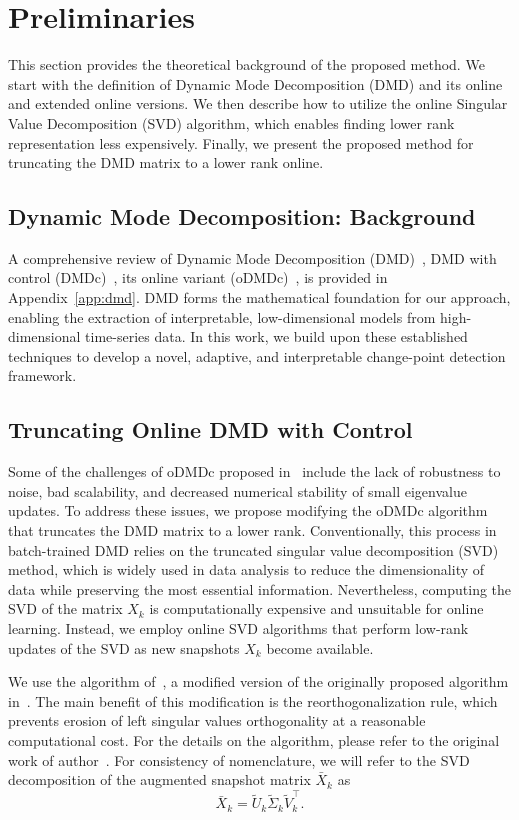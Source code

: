 \section{Preliminaries}\label{sec:preliminaries}

This section provides the theoretical background of the proposed method. We start with the definition of Dynamic Mode Decomposition (DMD) and its online and extended online versions. We then describe how to utilize the online Singular Value Decomposition (SVD) algorithm, which enables finding lower rank representation less expensively. Finally, we present the proposed method for truncating the DMD matrix to a lower rank online.

\subsection{Dynamic Mode Decomposition: Background}
A comprehensive review of Dynamic Mode Decomposition (DMD)~\cite{Schmid2010}, DMD with control (DMDc)~\cite{Proctor2016}, its online variant (oDMDc)~\cite{Zhang2019}, is provided in Appendix~\ref{app:dmd}. DMD forms the mathematical foundation for our approach, enabling the extraction of interpretable, low-dimensional models from high-dimensional time-series data. In this work, we build upon these established techniques to develop a novel, adaptive, and interpretable change-point detection framework.

\subsection{Truncating Online DMD with Control}\label{sec:truncating-online-dmd}
Some of the challenges of oDMDc proposed in~\cite{Zhang2019} include the lack of robustness to noise, bad scalability, and decreased numerical stability of small eigenvalue updates. To address these issues, we propose modifying the oDMDc algorithm that truncates the DMD matrix to a lower rank. Conventionally, this process in batch-trained DMD relies on the truncated singular value decomposition (SVD) method, which is widely used in data analysis to reduce the dimensionality of data while preserving the most essential information. Nevertheless, computing the SVD of the matrix \(X_k\) is computationally expensive and unsuitable for online learning. Instead, we employ online SVD algorithms that perform low-rank updates of the SVD as new snapshots \(X_k\) become available.

We use the algorithm of~\cite{Zhang2022}, a modified version of the originally proposed algorithm in~\cite{Brand2006}. The main benefit of this modification is the reorthogonalization rule, which prevents erosion of left singular values orthogonality at a reasonable computational cost. For the details on the algorithm, please refer to the original work of author~\cite{Zhang2022}. For consistency of nomenclature, we will refer to the SVD decomposition of the augmented snapshot matrix \(\bar{X}_k\) as
\begin{equation*}
    \bar{X}_k = \tilde{U}_k \tilde{\Sigma}_k \tilde{V}_k^\top.
\end{equation*}


